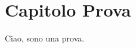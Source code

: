 \documentclass[a4paper, 11pt]{report}
\begin{document}
\tableofcontents
\chapter{Capitolo Prova}
Ciao, sono una prova.
\end{document}
